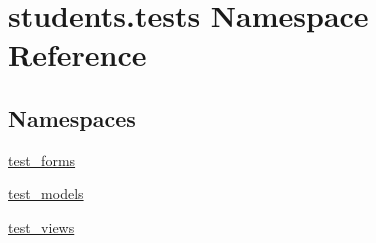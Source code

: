 \hypertarget{namespacestudents_1_1tests}{\section{students.\-tests Namespace Reference}
\label{namespacestudents_1_1tests}
}
\subsection*{Namespaces}
\begin{DoxyCompactItemize}
\item 
\hyperlink{namespacestudents_1_1tests_1_1test__forms}{test\-\_\-forms}
\item 
\hyperlink{namespacestudents_1_1tests_1_1test__models}{test\-\_\-models}
\item 
\hyperlink{namespacestudents_1_1tests_1_1test__views}{test\-\_\-views}
\end{DoxyCompactItemize}
